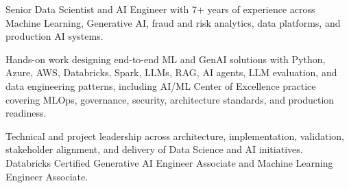 
{\small\color{cvtext}%
\noindent Senior Data Scientist and AI Engineer with 7+ years of experience across Machine Learning, Generative AI, fraud and risk analytics, data platforms, and production AI systems.\par
\vspace{0.14em}%
\noindent Hands-on work designing end-to-end ML and GenAI solutions with Python, Azure, AWS, Databricks, Spark, LLMs, RAG, AI agents, LLM evaluation, and data engineering patterns, including AI/ML Center of Excellence practice covering MLOps, governance, security, architecture standards, and production readiness.\par
\vspace{0.14em}%
\noindent Technical and project leadership across architecture, implementation, validation, stakeholder alignment, and delivery of Data Science and AI initiatives. Databricks Certified Generative AI Engineer Associate and Machine Learning Engineer Associate.\par
}

